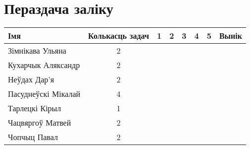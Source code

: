 \documentclass[12pt, a4paper]{extarticle}
\begin{document}
    \section{Пераздача заліку}
    \begin{table}[H]
        \begin{tabular}{|l|c|c|c|c|c|c|c|}
            \hline
            Імя                 & Колькасць задач &  1  &  2  &  3  &  4  &  5  &   Вынік  \\ \hline
            Зімнікава Ульяна    &        2        &  &  &  &  &  &    \\ \hline
            Кухарчык Аляксандр  &        2        &  &  &  &  &  &    \\ \hline
            Неўдах Дар'я        &        2        &  &  &  &  &  &    \\ \hline
            Пасуднеўскі Мікалай &        4        &  &  &  &  &  &    \\ \hline
            Тарлецкі Кірыл      &        1        &  &  &  &  &  &    \\ \hline
            Чацвяргоў Матвей    &        2        &  &  &  &  &  &    \\ \hline
            Чопчыц Павал        &        2        &  &  &  &  &  &    \\ \hline
        \end{tabular}
    \end{table}
\end{document}
